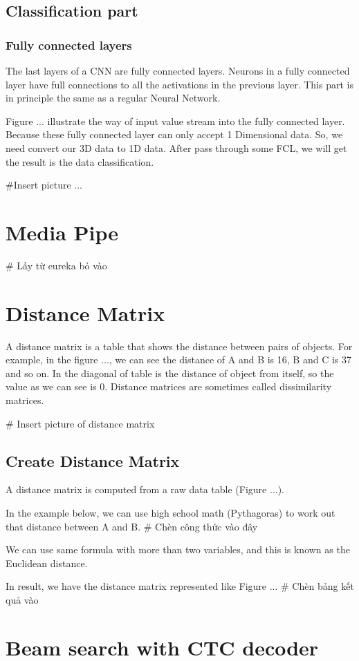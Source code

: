     \subsection{ Classification part }
      \subsubsection{ Fully connected layers }
        The last layers of a CNN are fully connected layers. Neurons in a 
        fully connected layer have full connections to all the activations in the previous 
        layer. This part is in principle the same as a regular Neural Network.

        Figure ... illustrate the way of input value stream into the fully connected layer.
        Because these fully connected layer can only accept 1 Dimensional data. So, we need convert our 3D
        data to 1D data. After pass through some FCL, we will get the result is the data
        classification.

        #Insert picture ...
  \section{ Media Pipe }
    # Lấy từ eureka bỏ vào


  \section{ Distance Matrix }
    A distance matrix is a table that shows the distance between pairs of objects.
    For example, in the figure ..., we can see the distance of A and B is 16, B and C is 37
    and so on. In the diagonal of table is the distance of object from itself, so the value
    as we can see is 0. Distance matrices are sometimes called dissimilarity matrices.

    # Insert picture of distance matrix

    \subsection{ Create Distance Matrix }
      A distance matrix is computed from a raw data table (Figure ...). 
      
      In the example below, we can use high school math (Pythagoras) to work out 
      that distance between A and B. 
        # Chèn công thức vào đây
      
      We can use same formula with more than two variables, and this is known as 
      the Euclidean distance.

      In result, we have the distance matrix represented like Figure ...
      # Chèn bảng kết quả vào
  
  \section{ Beam search with CTC decoder }

  

      

